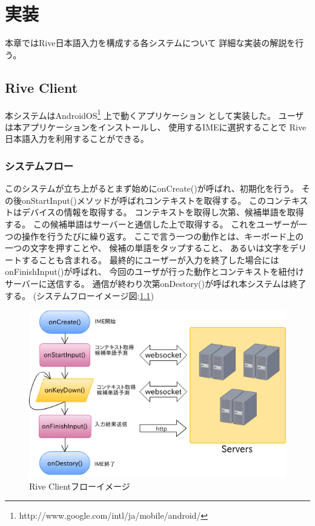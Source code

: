 \chapter{実装}
\label{chap:implementation}
本章ではRive日本語入力を構成する各システムについて
詳細な実装の解説を行う。

\newpage
\section{Rive Client}
\label{sec:riveclient}
本システムはAndroidOS\footnote[1]{http://www.google.com/intl/ja/mobile/android/}
上で動くアプリケーション
として実装した。
ユーザは本アプリケーションをインストールし、
使用するIMEに選択することで
Rive日本語入力を利用することができる。

\subsection{システムフロー}
このシステムが立ち上がるとまず始めにonCreate()が呼ばれ、初期化を行う。
その後onStartInput()メソッドが呼ばれコンテキストを取得する。
このコンテキストはデバイスの情報を取得する。
コンテキストを取得し次第、候補単語を取得する。
この候補単語はサーバーと通信した上で取得する。
これをユーザーが一つの操作を行うたびに繰り返す。
ここで言う一つの動作とは、キーボード上の一つの文字を押すことや、
候補の単語をタップすること、
あるいは文字をデリートすることも含まれる。
最終的にユーザーが入力を終了した場合にはonFinishInput()が呼ばれ、
今回のユーザが行った動作とコンテキストを紐付けサーバーに送信する。
通信が終わり次第onDestory()が呼ばれ本システムは終了する。
(システムフローイメージ図:\ref{fig:clientflow})
\begin{figure}[htbp]
  \begin{center}
    \includegraphics[width=140mm,bb=0 0 562 366]{images/clientflow}
  \end{center}
  \caption{Rive Clientフローイメージ}
  \label{fig:clientflow}
\end{figure}

